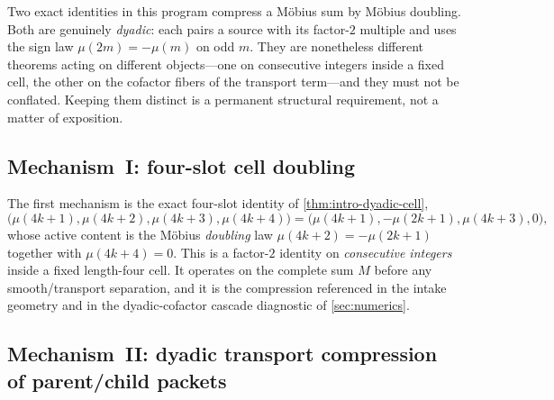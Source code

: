 \documentclass[11pt]{article}
\theoremstyle{definition}
\newcommand{\1}{\mathbf{1}}
\begin{document}
Two exact identities in this program compress a M\"obius sum by M\"obius doubling.  Both are genuinely \emph{dyadic}: each pairs a source with its factor-$2$ multiple and uses the sign law $\mu(2m)=-\mu(m)$ on odd $m$.  They are nonetheless different theorems acting on different objects---one on consecutive integers inside a fixed cell, the other on the cofactor fibers of the transport term---and they must not be conflated.  Keeping them distinct is a permanent structural requirement, not a matter of exposition.

\subsection{Mechanism~I: four-slot cell doubling}

The first mechanism is the exact four-slot identity of \cref{thm:intro-dyadic-cell},
\[
 \bigl(\mu(4k+1),\mu(4k+2),\mu(4k+3),\mu(4k+4)\bigr)
 =\bigl(\mu(4k+1),-\mu(2k+1),\mu(4k+3),0\bigr),
\]
whose active content is the M\"obius \emph{doubling} law $\mu(4k+2)=-\mu(2k+1)$ together with $\mu(4k+4)=0$.  This is a factor-$2$ identity on \emph{consecutive integers} inside a fixed length-four cell.  It operates on the complete sum $M$ before any smooth/transport separation, and it is the compression referenced in the intake geometry and in the dyadic-cofactor cascade diagnostic of \cref{sec:numerics}.

\subsection{Mechanism~II: dyadic transport compression of parent/child packets}
\end{document}
